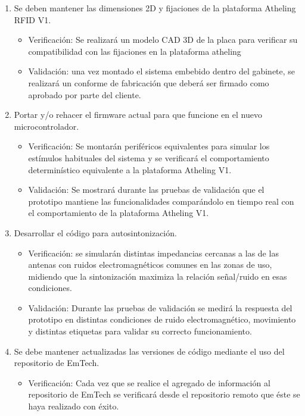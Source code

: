 \documentclass[
11pt, %
]{charter}
\begin{document}
\begin{enumerate}
\item Se deben mantener las dimensiones 2D y fijaciones de la plataforma Atheling RFID V1.
			\begin{itemize}
        	\item Verificación: Se realizará un modelo CAD 3D de la placa para verificar su compatibilidad con las fijaciones en la plataforma atheling
	       \item Validación: una vez montado el sistema embebido dentro del gabinete, se realizará un conforme de fabricación que deberá ser firmado como aprobado por parte del cliente. 
            \end{itemize}
			
	
\item Portar y/o rehacer el firmware actual para que funcione en el nuevo microcontrolador. 
			\begin{itemize}
        	\item Verificación: Se montarán periféricos equivalentes para simular los estímulos habituales del sistema y se verificará el comportamiento determinístico equivalente a la plataforma Atheling V1.
	        \item Validación: Se mostrará durante las pruebas de validación que el prototipo mantiene las funcionalidades comparándolo en tiempo real con el comportamiento de la plataforma Atheling V1. 
            \end{itemize}
\item Desarrollar el código para autosintonización.
		\begin{itemize}
     	\item Verificación: se simularán distintas impedancias cercanas a las de las antenas con ruidos electromagnéticos comunes en las zonas de uso, midiendo que la sintonización maximiza la relación señal/ruido en esas condiciones. 
	    \item Validación: Durante las pruebas de validación se medirá la respuesta del prototipo en distintas condiciones de ruido electromagnético, movimiento y distintas etiquetas para validar su correcto funcionamiento. 
        \end{itemize}
\item Se debe mantener actualizadas las versiones de código mediante el uso del repositorio de EmTech.
			\begin{itemize}
         	\item Verificación: Cada vez que se realice el agregado de información al repositorio de EmTech se verificará desde el repositorio remoto que éste se haya realizado con éxito. 

\end{itemize}
\end{enumerate}
\end{document}
